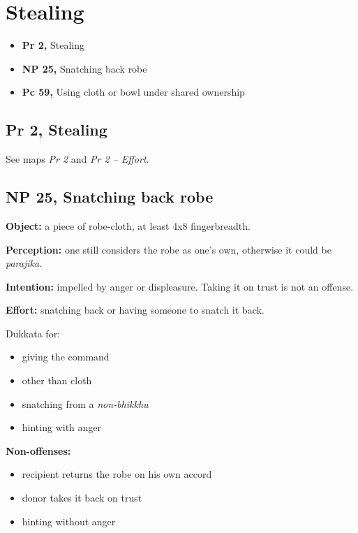 \chapter{Stealing}

\begin{itemize}
\tightlist
\item
  \textbf{Pr 2,} Stealing
\item
  \textbf{NP 25,} Snatching back robe
\item
  \textbf{Pc 59,} Using cloth or bowl under shared ownership
\end{itemize}

\section{Pr 2, Stealing}

See maps \emph{Pr 2} and \emph{Pr 2 -- Effort}.

\section{NP 25, Snatching back robe}

\textbf{Object:} a piece of robe-cloth, at least 4x8 fingerbreadth.

\textbf{Perception:} one still considers the robe as one's own,
otherwise it could be \emph{parajika}.

\textbf{Intention:} impelled by anger or displeasure. Taking it on trust
is not an offense.

\textbf{Effort:} snatching back or having someone to snatch it back.

Dukkata for:

\begin{itemize}
\tightlist
\item
  giving the command
\item
  other than cloth
\item
  snatching from a \emph{non-bhikkhu}
\item
  hinting with anger
\end{itemize}

\textbf{Non-offenses:}

\begin{itemize}
\tightlist
\item
  recipient returns the robe on his own accord
\item
  donor takes it back on trust
\item
  hinting without anger
\end{itemize}

